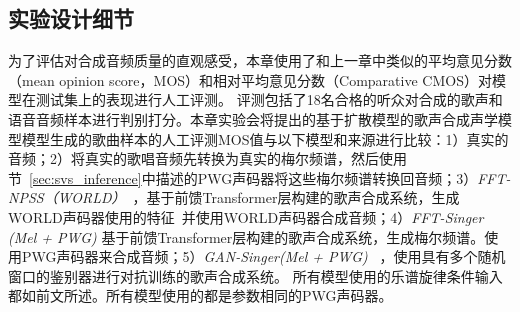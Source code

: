 \subsection{实验设计细节}
为了评估对合成音频质量的直观感受，本章使用了和上一章中类似的平均意见分数（mean opinion score，MOS）和相对平均意见分数（Comparative CMOS）对模型在测试集上的表现进行人工评测。 评测包括了18名合格的听众对合成的歌声和语音音频样本进行判别打分。本章实验会将提出的基于扩散模型的歌声合成声学模型模型生成的歌曲样本的人工评测MOS值与以下模型和来源进行比较：1）真实的音频；2）将真实的歌唱音频先转换为真实的梅尔频谱，然后使用节~\ref{sec:svs_inference}中描述的PWG声码器将这些梅尔频谱转换回音频；3）\textit{FFT-NPSS（WORLD）}~\citep{blaauw2020sequence}，基于前馈Transformer层构建的歌声合成系统，生成WORLD声码器使用的特征~\citep{morise2016world}并使用WORLD声码器合成音频；4）\textit{FFT-Singer (Mel + PWG)} 基于前馈Transformer层构建的歌声合成系统，生成梅尔频谱。使用PWG声码器来合成音频；5）\textit{GAN-Singer(Mel + PWG)}
~\citep{wu2020adversarially}，使用具有多个随机窗口的鉴别器进行对抗训练的歌声合成系统。
所有模型使用的乐谱旋律条件输入都如前文所述。所有模型使用的都是参数相同的PWG声码器。

